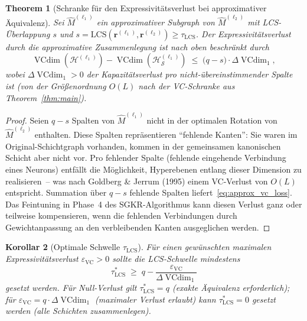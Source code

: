 \documentclass[12pt, a4paper, openany]{report}
\newtheorem{theorem}{Theorem}[chapter]
\newtheorem{corollary}[theorem]{Korollar}
\newcommand{\calH}{\mathcal{H}}
\newcommand{\calS}{\mathcal{S}}
\newcommand{\eps}{\varepsilon}
\DeclareMathOperator{\VC}{VCdim}
\begin{document}
\begin{theorem}[Schranke für den Expressivitätsverlust bei approximativer Äquivalenz]
\label{thm:expressivity_approx}
Sei $\hat{M}^{(\ell_1)}$ ein approximativer Subgraph von $\hat{M}^{(\ell_2)}$
mit LCS-Überlappung $s$ und $s = \mathrm{LCS}(\bm{r}^{(\ell_1)}, \bm{r}^{(\ell_2)}) \geq \tau_{\mathrm{LCS}}$.
Der Expressivitätsverlust durch die approximative Zusammenlegung ist nach oben
beschränkt durch
\begin{equation}
  \label{eq:approx_vc_loss}
  \VC(\calH^{(\ell_1)}) - \VC(\calH_{\calS}^{(\ell_1)})
  \;\leq\;
  \bigl(q - s\bigr) \cdot \Delta\VC_1,
\end{equation}
wobei $\Delta\VC_1 > 0$ der Kapazitätsverlust pro nicht-übereinstimmender
Spalte ist (von der Größenordnung $O(L)$ nach der VC-Schranke aus
Theorem~\ref{thm:main}).
\end{theorem}

\begin{proof}
Seien $q - s$ Spalten von $\hat{M}^{(\ell_1)}$ nicht in der optimalen Rotation
von $\hat{M}^{(\ell_2)}$ enthalten.  Diese Spalten repräsentieren
``fehlende Kanten'': Sie waren im Original-Schichtgraph vorhanden, kommen
in der gemeinsamen kanonischen Schicht aber nicht vor.  Pro fehlender
Spalte (fehlende eingehende Verbindung eines Neurons) entfällt die Möglichkeit,
Hyperebenen entlang dieser Dimension zu realisieren~-- was nach Goldberg \&
Jerrum (1995) einem VC-Verlust von $O(L)$ entspricht.  Summation über
$q - s$ fehlende Spalten liefert~\eqref{eq:approx_vc_loss}.  Das
Feintuning in Phase~4 des SGKR-Algorithmus kann diesen Verlust ganz oder
teilweise kompensieren, wenn die fehlenden Verbindungen durch Gewichtanpassung
an den verbleibenden Kanten ausgeglichen werden.
\end{proof}

\begin{corollary}[Optimale Schwelle $\tau_{\mathrm{LCS}}$]
\label{cor:optimal_tau}
Für einen gewünschten maximalen Expressivitätsverlust
$\eps_{\mathrm{VC}} > 0$ sollte die LCS-Schwelle mindestens
\[
  \tau_{\mathrm{LCS}}^*
  \;\geq\; q - \frac{\eps_{\mathrm{VC}}}{\Delta\VC_1}
\]
gesetzt werden.  Für Null-Verlust gilt $\tau_{\mathrm{LCS}}^* = q$ (exakte
Äquivalenz erforderlich); für $\eps_{\mathrm{VC}} = q \cdot \Delta\VC_1$
(maximaler Verlust erlaubt) kann $\tau_{\mathrm{LCS}}^* = 0$ gesetzt werden
(alle Schichten zusammenlegen).
\end{corollary}
\end{document}
